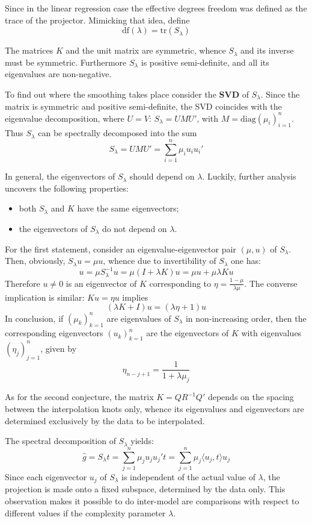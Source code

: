 \documentclass[a4paper]{article}
\newcommand{\tr}{\text{tr}}
\begin{document}
Since in the linear regression case the effective degrees freedom was defined as
the trace of the projector. Mimicking that idea, define
\[\text{df}(\lambda) = \tr(S_\lambda)\]

The matrices $K$ and the unit matrix are symmetric, whence $S_\lambda$ and its inverse
must be symmetric. Furthermore $S_\lambda$ is positive semi-definite, and all its
eigenvalues are non-negative.

To find out where the smoothing takes place consider the \textbf{SVD} of $S_\lambda$.
Since the matrix is symmetric and positive semi-definite, the SVD coincides with
the eigenvalue decomposition, where $U=V$: $S_\lambda = U M U'$, with
$M = \text{diag}(\mu_i)_{i=1}^n$. Thus $S_\lambda$ can be spectrally decomposed
into the sum
\[
S_\lambda
= U M U'
= \sum_{i=1}^n \mu_i u_i u_i'
\]

In general, the eigenvectors of $S_\lambda$ should depend on $\lambda$. Luckily,
further analysis uncovers the following properties:
\begin{itemize}
	\item both $S_\lambda$ and $K$ have the same eigenvectors;
	\item the eigenvectors of $S_\lambda$ do not depend on $\lambda$.
\end{itemize}

For the first statement, consider an eigenvalue-eigenvector pair $(\mu, u)$ of
$S_\lambda$. Then, obviously, $S_\lambda u = \mu u$, whence due to invertibility
of $S_\lambda$ one has:
\[
u
= \mu S_\lambda^{-1} u
= \mu (I+\lambda K) u
= \mu u + \mu \lambda K u
\]
Therefore $u\neq 0$ is an eigenvector of $K$ corresponding to $\eta = \frac{1-\mu}{\lambda \mu}$.
The converse implication is similar: $K u = \eta u$ implies
\[ ( \lambda K + I ) u = ( \lambda \eta + 1 ) u \]
In conclusion, if $(\mu_k)_{k=1}^n$ are eigenvalues of $S_\lambda$ in non-increasing
order, then the corresponding eigenvectors $(u_k)_{k=1}^n$ are the eigenvectors
of $K$ with eigenvalues $(\eta_j)_{j=1}^n$, given by 
\[\eta_{n-j+1} = \frac{1}{1 + \lambda \mu_j}\]

As for the second conjecture, the matrix $K = Q R^{-1} Q'$ depends on the spacing
between the interpolation knots only, whence its eigenvalues and eigenvectors are
determined exclusively by the data to be interpolated.

The spectral decomposition of $S_\lambda$ yields:
\[
\hat{g}
= S_\lambda t
= \sum_{j=1}^n \mu_j u_j u_j' t
= \sum_{j=1}^n \mu_j \langle u_j, t \rangle u_j
\]
Since each eigenvector $u_j$ of $S_\lambda$ is independent of the actual value
of $\lambda$, the projection is made onto a fixed subspace, determined by the data
only. This observation makes it possible to do inter-model are comparisons with
respect to different values if the complexity parameter $\lambda$.
\end{document}

